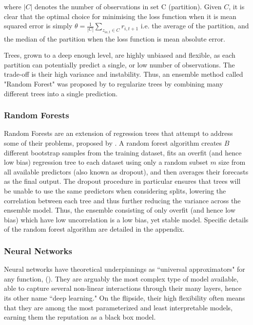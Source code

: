 \documentclass[11pt, a4paper, table]{article}
\begin{document}
where $|C|$ denotes the number of observations in set C (partition). Given $C$, it is clear that the optimal choice for minimising the loss function when it is mean squared error is simply $\theta = \frac{1}{|C|} \sum_{z_{io,t}\in C}^{ }r_{i,t+1}$ i.e. the average of the partition, and the median of the partition when the loss function is mean absolute error.

Trees, grown to a deep enough level, are highly unbiased and flexible, as each partition can potentially predict a single, or low number of observations. The trade-off is their high variance and instability. Thus, an ensemble method called "Random Forest" was proposed by \cite{breiman_random_2001} to regularize trees by combining many different trees into a single prediction.

\subsubsection{Random Forests}
Random Forests are an extension of regression trees that attempt to address some of their problems, proposed by \cite{breiman_random_2001}. A random forest algorithm creates $B$ different bootstrap samples from the training dataset, fits an overfit (and hence low bias) regression tree to each dataset using only a random subset $m$ size from all available predictors (also known as dropout), and then averages their forecasts as the final output. The dropout procedure in particular ensures that trees will be unable to use the same predictors when considering splits, lowering the correlation between each tree and thus further reducing the variance across the ensemble model. Thus, the ensemble consisting of only overfit (and hence low bias) which have low uncorrelation is a low bias, yet stable model. Specific details of the random forest algorithm are detailed in the appendix.

\subsubsection{Neural Networks}

Neural networks have theoretical underpinnings as ``universal approximators" for any function, (\cite{hornik_multilayer_1989}). They are arguably the most complex type of model available, able to capture several non-linear interactions through their many layers, hence its other name ``deep learning."  On the flipside, their high flexibility often means that they are among the most parameterized and least interpretable models, earning them the reputation as a black box model.
\end{document}
